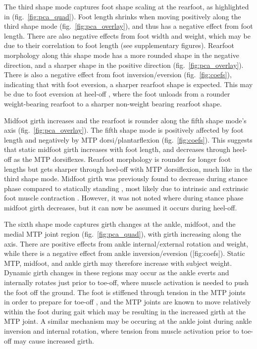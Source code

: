 \documentclass[defaultstyle,11pt]{comps}
\begin{document}
The third shape mode captures foot shape scaling at the rearfoot, as highlighted in (fig.~\ref{fig:pca_quad}).
Foot length shrinks when moving positively along the third shape mode (fig.~\ref{fig:pca_overlay}), and thus has a negative effect from foot length.
There are also negative effects from foot width and weight, which may be due to their correlation to foot length (see supplementary figures).
Rearfoot morphology along this shape mode has a more rounded shape in the negative direction, and a sharper shape in the positive direction (fig.~\ref{fig:pca_overlay}).
There is also a negative effect from foot inversion/eversion (fig.~\ref{fig:coefs}), indicating that with foot eversion, a sharper rearfoot shape is expected.
This may be due to foot eversion at heel-off \citep{Leardini2007}, where the foot unloads from a rounder weight-bearing rearfoot to a sharper non-weight bearing rearfoot shape.

Midfoot girth increases and the rearfoot is rounder along the fifth shape mode's axis (fig.~\ref{fig:pca_overlay}).
The fifth shape mode is positively affected by foot length and negatively by MTP dorsi/plantarflexion (fig.~\ref{fig:coefs}).
This suggests that static midfoot girth increases with foot length, and decreases through heel-off as the MTP dorsiflexes.
Rearfoot morphology is rounder for longer foot lengths but gets sharper through heel-off with MTP dorsiflexion, much like in the third shape mode.
Midfoot girth was previously found to decrease during stance phase compared to statically standing \citep{Grau2018}, most likely due to intrinsic and extrinsic foot muscle contraction \citep{Scott1993, Gefen2000}.
However, it was not noted where during stance phase midfoot girth decreases, but it can now be assumed it occurs during heel-off.

The sixth shape mode captures girth changes at the ankle, midfoot, and the medial MTP joint region (fig.~\ref{fig:pca_quad}), with girth increasing along the axis.
There are positive effects from ankle internal/external rotation and weight, while there is a negative effect from ankle inversion/eversion ({[}fig:coefs{]}).
Static MTP, midfoot, and ankle girth may therefore increase with subject weight.
Dynamic girth changes in these regions may occur as the ankle everts and internally rotates just prior to toe-off, where muscle activation is needed to push the foot off the ground.
The foot is stiffened through tension in the MTP joints in order to prepare for toe-off \citep{Hicks1954}, and the MTP joints are known to move relatively within the foot during gait \citep{Wolf2008, Lundgren2008} which may be resulting in the increased girth at the MTP joint.
A similar mechanism may be occuring at the ankle joint during ankle inversion and internal rotation, where tension from muscle activation prior to toe-off may cause increased girth.
\end{document}
